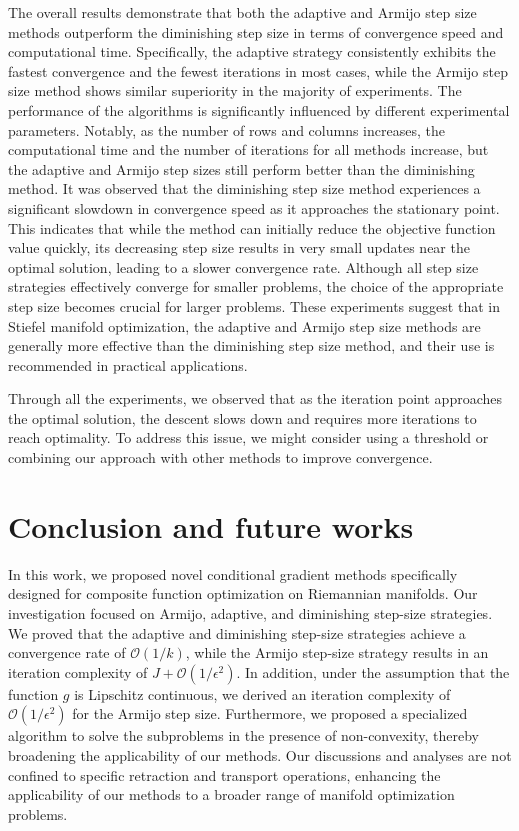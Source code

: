 \documentclass[pdflatex,sn-mathphys-num]{sn-jnl}%
\theoremstyle{definition} %
\theoremstyle{remark} %
\begin{document}
The overall results demonstrate that both the adaptive and Armijo step size methods outperform the diminishing step size in terms of convergence speed and computational time. Specifically, the adaptive strategy consistently exhibits the fastest convergence and the fewest iterations in most cases, while the Armijo step size method shows similar superiority in the majority of experiments. The performance of the algorithms is significantly influenced by different experimental parameters. Notably, as the number of rows and columns increases, the computational time and the number of iterations for all methods increase, but the adaptive and Armijo step sizes still perform better than the diminishing method. It was observed that the diminishing step size method experiences a significant slowdown in convergence speed as it approaches the stationary point. This indicates that while the method can initially reduce the objective function value quickly, its decreasing step size results in very small updates near the optimal solution, leading to a slower convergence rate. 
Although all step size strategies effectively converge for smaller problems, the choice of the appropriate step size becomes crucial for larger problems. These experiments suggest that in Stiefel manifold optimization, the adaptive and Armijo step size methods are generally more effective than the diminishing step size method, and their use is recommended in practical applications.

Through all the experiments, we observed that as the iteration point approaches the optimal solution, the descent slows down and requires more iterations to reach optimality. To address this issue, we might consider using a threshold or combining our approach with other methods to improve convergence.

\section{Conclusion and future works}
\label{sec: conclusion}
In this work, we proposed novel conditional gradient methods specifically designed for composite function optimization on Riemannian manifolds. Our investigation focused on Armijo, adaptive, and diminishing step-size strategies. We proved that the adaptive and diminishing step-size strategies achieve a convergence rate of \( \mathcal{O}(1/k) \), while the Armijo step-size strategy results in an iteration complexity of \( J + \mathcal{O}(1/\epsilon^2) \). In addition, under the assumption that the function \( g \) is Lipschitz continuous, we derived an iteration complexity of \( \mathcal{O}(1/\epsilon^2) \) for the Armijo step size.
Furthermore, we proposed a specialized algorithm to solve the subproblems in the presence of non-convexity, thereby broadening the applicability of our methods.
Our discussions and analyses are not confined to specific retraction and transport operations, enhancing the applicability of our methods to a broader range of manifold optimization problems. 
\end{document}
